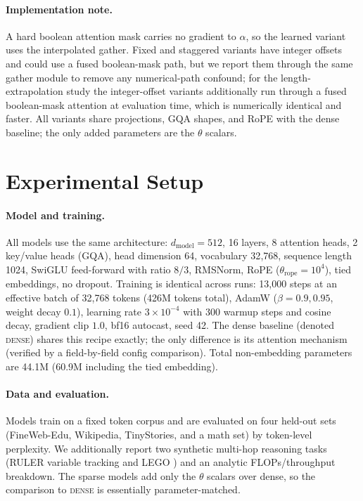 \documentclass[11pt]{article}
\begin{document}
\paragraph{Implementation note.}
A hard boolean attention mask carries no gradient to $\alpha$, so the learned
variant uses the interpolated gather. Fixed and staggered variants have integer
offsets and could use a fused boolean-mask path, but we report them through the
same gather module to remove any numerical-path confound; for the
length-extrapolation study the integer-offset variants additionally run through a
fused boolean-mask attention at evaluation time, which is numerically identical
and faster. All variants share projections, GQA shapes, and RoPE with the dense
baseline; the only added parameters are the $\theta$ scalars.

\section{Experimental Setup}
\label{sec:setup}

\paragraph{Model and training.}
All models use the same architecture: $d_{\text{model}}=512$, 16 layers, 8
attention heads, 2 key/value heads (GQA), head dimension 64, vocabulary 32{,}768,
sequence length 1024, SwiGLU feed-forward with ratio $8/3$, RMSNorm, RoPE
($\theta_{\text{rope}}=10^4$), tied embeddings, no dropout. Training is identical
across runs: 13{,}000 steps at an effective batch of 32{,}768 tokens
(426M tokens total), AdamW ($\beta=0.9,0.95$, weight decay $0.1$), learning rate
$3\times10^{-4}$ with 300 warmup steps and cosine decay, gradient clip $1.0$,
bf16 autocast, seed 42. The dense baseline (denoted \textsc{dense}) shares this
recipe exactly; the only difference is its attention mechanism (verified by a
field-by-field config comparison). Total non-embedding parameters are 44.1M
(60.9M including the tied embedding).

\paragraph{Data and evaluation.}
Models train on a fixed token corpus and are evaluated on four held-out sets
(FineWeb-Edu, Wikipedia, TinyStories, and a math set) by token-level perplexity.
We additionally report two synthetic multi-hop reasoning tasks (RULER variable
tracking \citep{hsieh2024ruler} and LEGO \citep{zhang2022lego}) and an
analytic FLOPs/throughput breakdown. The sparse models add only the $\theta$
scalars over dense, so the comparison to \textsc{dense} is essentially
parameter-matched.
\end{document}
